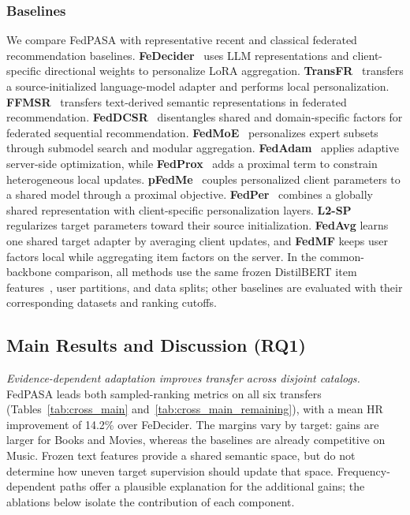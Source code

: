 \subsubsection{Baselines}
We compare FedPASA with representative recent and classical federated recommendation baselines. \textbf{FeDecider}~\citep{he2026fedecider} uses LLM representations and client-specific directional weights to personalize LoRA aggregation. \textbf{TransFR}~\citep{zhang2026transfr} transfers a source-initialized language-model adapter and performs local personalization. \textbf{FFMSR}~\citep{lu2025ffmsr} transfers text-derived semantic representations in federated recommendation. \textbf{FedDCSR}~\citep{zhang2024feddcsr} disentangles shared and domain-specific factors for federated sequential recommendation. \textbf{FedMoE}~\citep{mei2024fedmoe} personalizes expert subsets through submodel search and modular aggregation. \textbf{FedAdam}~\citep{reddi2021adaptive} applies adaptive server-side optimization, while \textbf{FedProx}~\citep{li2020federated} adds a proximal term to constrain heterogeneous local updates. \textbf{pFedMe}~\citep{dinh2020personalized} couples personalized client parameters to a shared model through a proximal objective. \textbf{FedPer}~\citep{arivazhagan2019federated} combines a globally shared representation with client-specific personalization layers. \textbf{L2-SP}~\citep{li2018explicit} regularizes target parameters toward their source initialization. \textbf{FedAvg} learns one shared target adapter by averaging client updates, and \textbf{FedMF} keeps user factors local while aggregating item factors on the server. In the common-backbone comparison, all methods use the same frozen DistilBERT item features~\citep{sanh2019distilbert}, user partitions, and data splits; other baselines are evaluated with their corresponding datasets and ranking cutoffs.

\subsection{Main Results and Discussion (RQ1)}
\label{sec:exp-main}








\noindent\textit{Evidence-dependent adaptation improves transfer across disjoint catalogs.}
FedPASA leads both sampled-ranking metrics on all six transfers (Tables~\ref{tab:cross_main} and~\ref{tab:cross_main_remaining}), with a mean HR improvement of 14.2\% over FeDecider. The margins vary by target: gains are larger for Books and Movies, whereas the baselines are already competitive on Music. Frozen text features provide a shared semantic space, but do not determine how uneven target supervision should update that space. Frequency-dependent paths offer a plausible explanation for the additional gains; the ablations below isolate the contribution of each component.


